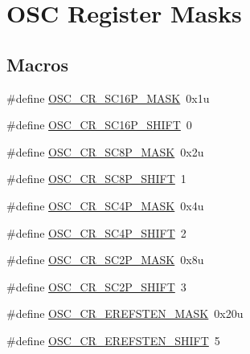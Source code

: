 \hypertarget{group___o_s_c___register___masks}{}\section{O\+SC Register Masks}
\label{group___o_s_c___register___masks}
\subsection*{Macros}
\begin{DoxyCompactItemize}
\item 
\#define \hyperlink{group___o_s_c___register___masks_ga8c73f0e22875a434f8031986a9e5f8b4}{O\+S\+C\+\_\+\+C\+R\+\_\+\+S\+C16\+P\+\_\+\+M\+A\+SK}~0x1u
\item 
\#define \hyperlink{group___o_s_c___register___masks_ga4bcf6535cd7e7c4ff935f6b544ca3f9a}{O\+S\+C\+\_\+\+C\+R\+\_\+\+S\+C16\+P\+\_\+\+S\+H\+I\+FT}~0
\item 
\#define \hyperlink{group___o_s_c___register___masks_ga1a5a0db08efaf66c34caf98136cbec11}{O\+S\+C\+\_\+\+C\+R\+\_\+\+S\+C8\+P\+\_\+\+M\+A\+SK}~0x2u
\item 
\#define \hyperlink{group___o_s_c___register___masks_ga6f17376a1571a200e55cac51d1358503}{O\+S\+C\+\_\+\+C\+R\+\_\+\+S\+C8\+P\+\_\+\+S\+H\+I\+FT}~1
\item 
\#define \hyperlink{group___o_s_c___register___masks_ga18f4104a5a6c0d94f0592ee06732fe03}{O\+S\+C\+\_\+\+C\+R\+\_\+\+S\+C4\+P\+\_\+\+M\+A\+SK}~0x4u
\item 
\#define \hyperlink{group___o_s_c___register___masks_gab1724a5b1e96efb22e48a9478ae8cf25}{O\+S\+C\+\_\+\+C\+R\+\_\+\+S\+C4\+P\+\_\+\+S\+H\+I\+FT}~2
\item 
\#define \hyperlink{group___o_s_c___register___masks_ga94a8b0e48d18793bde1a3aaaea44b92c}{O\+S\+C\+\_\+\+C\+R\+\_\+\+S\+C2\+P\+\_\+\+M\+A\+SK}~0x8u
\item 
\#define \hyperlink{group___o_s_c___register___masks_ga0ec9adaf1ca3ec309f1a2c2fd37d3f4d}{O\+S\+C\+\_\+\+C\+R\+\_\+\+S\+C2\+P\+\_\+\+S\+H\+I\+FT}~3
\item 
\#define \hyperlink{group___o_s_c___register___masks_ga3024913f44011d333c6f48ddb00fbf9d}{O\+S\+C\+\_\+\+C\+R\+\_\+\+E\+R\+E\+F\+S\+T\+E\+N\+\_\+\+M\+A\+SK}~0x20u
\item 
\#define \hyperlink{group___o_s_c___register___masks_gac1b9c5d7f156f1792255204dae816aba}{O\+S\+C\+\_\+\+C\+R\+\_\+\+E\+R\+E\+F\+S\+T\+E\+N\+\_\+\+S\+H\+I\+FT}~5
\item 

\end{DoxyCompactItemize}
